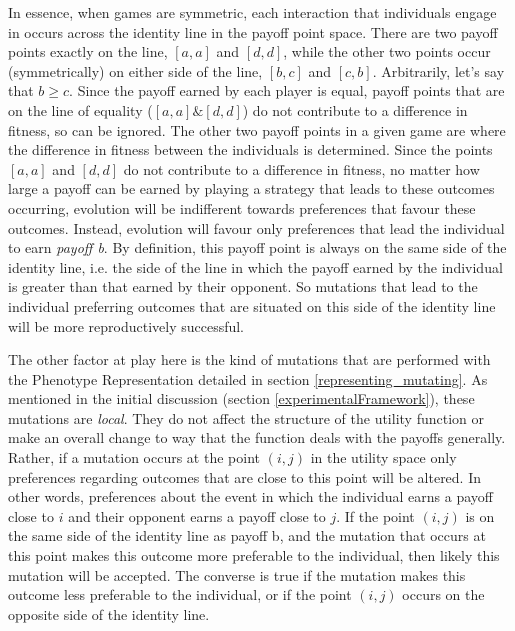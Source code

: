 \documentclass[11pt]{book}
\newcommand*{\np}{\par\noindent\newline}
\begin{document}
\np In essence, when games are symmetric, each interaction that individuals engage in occurs across the identity line in the payoff point space.
There are two payoff points exactly on the line, $[a,a]$ and $[d,d]$, while the other two points occur (symmetrically) on either side of the line, $[b,c]$ and $[c,b]$.
Arbitrarily, let's say that $b \geq c$.
Since the payoff earned by each player is equal, payoff points that are on the line of equality ($[a,a] \& [d,d]$) do not contribute to a difference in fitness, so can be ignored.
The other two payoff points in a given game are where the difference in fitness between the individuals is determined.
Since the points $[a,a]$ and $[d,d]$ do not contribute to a difference in fitness, no matter how large a payoff can be earned by playing a strategy that leads to these outcomes occurring, evolution will be indifferent towards preferences that favour these outcomes.
Instead, evolution will favour only preferences that lead the individual to earn \textit{payoff b}.
By definition, this payoff point is always on the same side of the identity line, i.e. the side of the line in which the payoff earned by the individual is greater than that earned by their opponent.
So mutations that lead to the individual preferring outcomes that are situated on this side of the identity line will be more reproductively successful.

\np The other factor at play here is the kind of mutations that are performed with the Phenotype Representation detailed in section \ref{representing_mutating}.
As mentioned in the initial discussion (section \ref{experimentalFramework}), these mutations are \textit{local}.
They do not affect the structure of the utility function or make an overall change to way that the function deals with the payoffs generally.
Rather, if a mutation occurs at the point $(i, j)$ in the utility space only preferences regarding outcomes that are close to this point will be altered.
In other words, preferences about the event in which the individual earns a payoff close to $i$ and their opponent earns a payoff close to $j$.
If the point $(i, j)$ is on the same side of the identity line as payoff b, and the mutation that occurs at this point makes this outcome more preferable to the individual, then likely this mutation will be accepted.
The converse is true if the mutation makes this outcome less preferable to the individual, or if the point $(i, j)$ occurs on the opposite side of the identity line.
\end{document}

